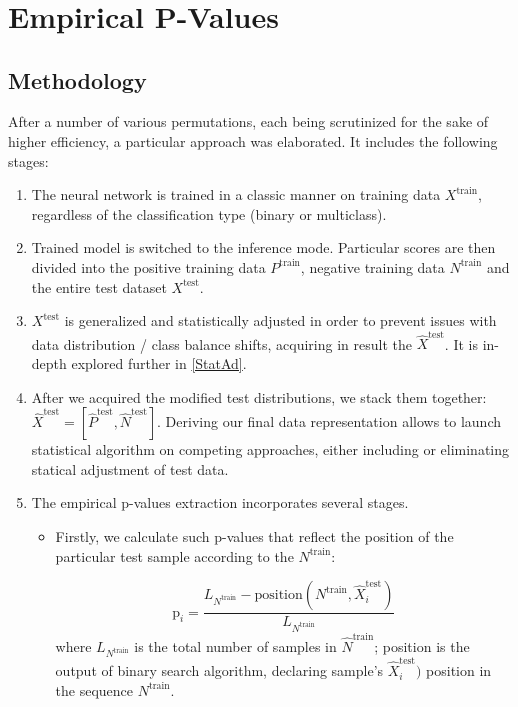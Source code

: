 \documentclass{article}
\begin{document}
\ 

\ 

\ 
 

\section{Empirical P-Values}

\subsection{Methodology}
After a number of various permutations, each being scrutinized for the sake of higher efficiency, a particular approach was elaborated. It includes the following stages:


\begin{enumerate}%
    \item The neural network is trained in a classic manner on training data $X^{\text{train}}$, regardless of the classification type (binary or multiclass).
    \item Trained model is switched to the inference mode. Particular scores are then divided into the positive training data $P^{\text{train}}$, negative training data $N^{\text{train}}$ and the entire test dataset $X^{\text{test}}$.
    
    \item $X^{\text{test}}$ is generalized and statistically adjusted in order to prevent issues with data distribution / class balance shifts, acquiring in result the $\hat{X}^{\text{test}}$. It is in-depth explored further in \ref{StatAd}.

    \item  After we acquired the modified test distributions, we stack them together: $\hat{X}^{\text{test}} = [\hat{P}^{\text{test}}, \hat{N}^{\text{test}}]$. Deriving our final data representation allows to launch statistical algorithm on competing approaches, either including or eliminating statical adjustment of test data.

    \item The empirical p-values extraction incorporates several stages. \begin{itemize}
        \item  Firstly, we calculate such p-values that reflect the position of the particular test sample according to the $N^{\text{train}}$:

    \begin{equation}
        \text{p}_i = \frac{L_{N^{\text{train}}} - \text{position}(N^\text{train}, \hat{X}^{\text{test}}_i)}{L_{N^{\text{train}}}}
    \end{equation}
    where $L_{N^{\text{train}}}$ is the total number of samples in $\hat{N}^{\text{train}}$; position is the output of binary search algorithm, declaring sample's $\hat{X}^{\text{test}}_i)$ position in the sequence $N^{\text{train}}$. 


\end{itemize}
\end{enumerate}
\end{document}

